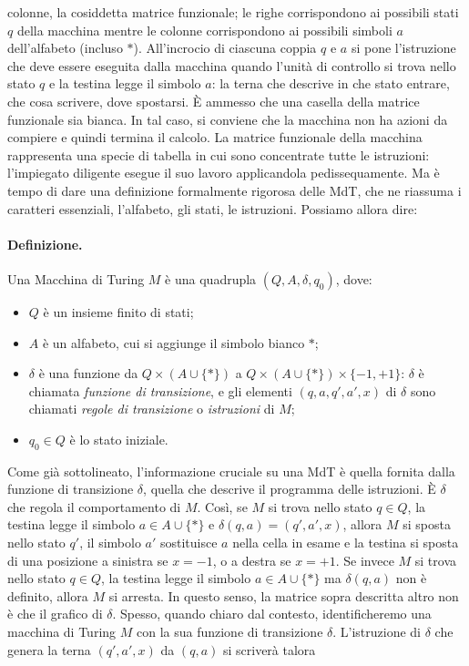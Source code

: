 colonne, la cosiddetta matrice funzionale; le righe corrispondono ai possibili
stati $q$ della macchina mentre le colonne corrispondono ai possibili simboli $a$
dell'alfabeto (incluso $*$). All'incrocio di ciascuna coppia $q$ e $a$ si pone
l'istruzione che
deve essere eseguita dalla macchina quando l'unità di controllo si trova nello
stato $q$ e la testina legge il simbolo $a$: la terna che descrive in che stato
entrare, che
cosa scrivere, dove spostarsi. È ammesso che una casella della matrice funzionale
sia bianca. In tal caso, si conviene che la macchina non ha azioni da compiere e
quindi termina il calcolo.
La matrice funzionale della macchina rappresenta una specie di tabella in cui
sono concentrate tutte le istruzioni: l'impiegato diligente esegue il suo lavoro
applicandola pedissequamente.
Ma è tempo di dare una definizione formalmente rigorosa delle MdT, che ne
riassuma i caratteri essenziali, l'alfabeto, gli stati, le istruzioni.
Possiamo allora dire:

\paragraph{Definizione.}
Una Macchina di Turing $M$ è una quadrupla $(Q, A, \delta, q_0)$, dove:

\begin{itemize}
    \item $Q$ è un insieme finito di stati;
    \item $A$ è un alfabeto, cui si aggiunge il simbolo bianco $*$;
    \item $\delta$ è una funzione da $Q \times (A \cup \{*\})$ a
          $Q \times (A \cup \{*\}) \times \{ -1, +1\}$: $\delta$ è chiamata
          \textit{funzione di transizione}, e gli elementi $(q, a, q', a', x)$
          di $\delta$ sono chiamati \textit{regole
              di transizione} o \textit{istruzioni} di $M$;
    \item $q_0 \in Q$ è lo stato iniziale.
\end{itemize}

Come già sottolineato, l'informazione cruciale su una MdT è quella fornita dalla
funzione di transizione $\delta$, quella che descrive il programma delle istruzioni.
È $\delta$ che regola il comportamento di $M$.
Così, se $M$ si trova nello stato $q \in Q$, la
testina legge il simbolo $a \in A \cup \{*\}$ e $\delta(q, a) = (q', a', x)$,
allora $M$ si sposta
nello stato $q'$, il simbolo $a'$ sostituisce $a$ nella cella in esame e la
testina si sposta
di una posizione a sinistra se $x = -1$, o a destra se $x = +1$. Se invece $M$ si
trova nello stato $q \in Q$, la testina legge il simbolo $a \in A \cup \{*\}$ ma
$\delta(q, a)$ non
è definito, allora $M$ si arresta. In questo senso, la matrice sopra descritta
altro
non è che il grafico di $\delta$. Spesso, quando chiaro dal contesto,
identificheremo una
macchina di Turing $M$ con la sua funzione di transizione $\delta$.
L'istruzione di $\delta$ che
genera la terna $(q', a', x)$ da $(q, a)$ si scriverà talora

